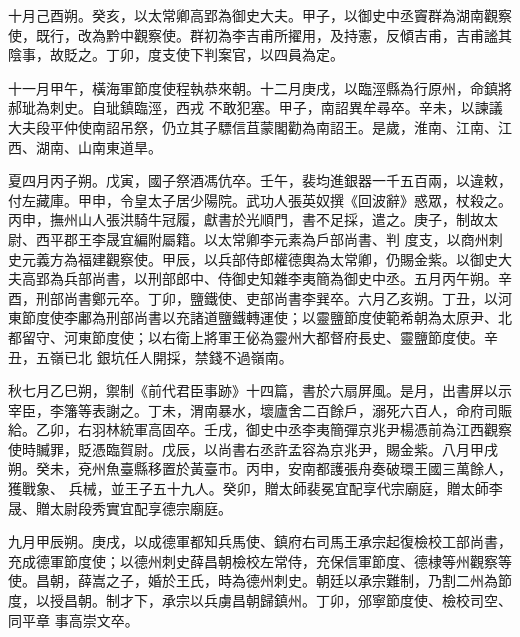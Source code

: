 \begin{pinyinscope}
 十月己酉朔。癸亥，以太常卿高郢為御史大夫。甲子，以御史中丞竇群為湖南觀察使，既行，改為黔中觀察使。群初為李吉甫所擢用，及持憲，反傾吉甫，吉甫謐其陰事，故貶之。丁卯，度支使下判案官，以四員為定。



 十一月甲午，橫海軍節度使程執恭來朝。十二月庚戌，以臨涇縣為行原州，命鎮將郝玼為刺史。自玼鎮臨涇，西戎
 不敢犯塞。甲子，南詔異牟尋卒。辛未，以諫議大夫段平仲使南詔吊祭，仍立其子驃信苴蒙閣勸為南詔王。是歲，淮南、江南、江西、湖南、山南東道旱。



 夏四月丙子朔。戊寅，國子祭酒馮伉卒。壬午，裴均進銀器一千五百兩，以違敕，付左藏庫。甲申，令皇太子居少陽院。武功人張英奴撰《回波辭》惑眾，杖殺之。丙申，撫州山人張洪騎牛冠履，獻書於光順門，書不足採，遣之。庚子，制故太尉、西平郡王李晟宜編附屬籍。以太常卿李元素為戶部尚書、判
 度支，以商州刺史元義方為福建觀察使。甲辰，以兵部侍郎權德輿為太常卿，仍賜金紫。以御史大夫高郢為兵部尚書，以刑部郎中、侍御史知雜李夷簡為御史中丞。五月丙午朔。辛酉，刑部尚書鄭元卒。丁卯，鹽鐵使、吏部尚書李巽卒。六月乙亥朔。丁丑，以河東節度使李鄘為刑部尚書以充諸道鹽鐵轉運使；以靈鹽節度使範希朝為太原尹、北都留守、河東節度使；以右衛上將軍王佖為靈州大都督府長史、靈鹽節度使。辛丑，五嶺已北
 銀坑任人開採，禁錢不過嶺南。



 秋七月乙巳朔，禦制《前代君臣事跡》十四篇，書於六扇屏風。是月，出書屏以示宰臣，李籓等表謝之。丁未，渭南暴水，壞廬舍二百餘戶，溺死六百人，命府司賑給。乙卯，右羽林統軍高固卒。壬戌，御史中丞李夷簡彈京兆尹楊憑前為江西觀察使時贓罪，貶憑臨賀尉。戊辰，以尚書右丞許孟容為京兆尹，賜金紫。八月甲戌朔。癸未，兗州魚臺縣移置於黃臺市。丙申，安南都護張舟奏破環王國三萬餘人，獲戰象、
 兵械，並王子五十九人。癸卯，贈太師裴冕宜配享代宗廟庭，贈太師李晟、贈太尉段秀實宜配享德宗廟庭。



 九月甲辰朔。庚戌，以成德軍都知兵馬使、鎮府右司馬王承宗起復檢校工部尚書，充成德軍節度使；以德州刺史薛昌朝檢校左常侍，充保信軍節度、德棣等州觀察等使。昌朝，薛嵩之子，婚於王氏，時為德州刺史。朝廷以承宗難制，乃割二州為節度，以授昌朝。制才下，承宗以兵虜昌朝歸鎮州。丁卯，邠寧節度使、檢校司空、同平章
 事高崇文卒。




\end{pinyinscope}
